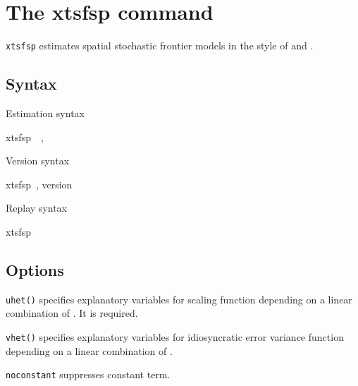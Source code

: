
\section{The xtsfsp command}
{\tt xtsfsp} estimates spatial stochastic frontier models in the style of \cite{orea2019new} and \cite{galli2022spatial}.

\subsection{Syntax}

Estimation syntax

\begin{stsyntax}
	xtsfsp\
    \depvar\
    \optindepvars,\
\end{stsyntax}



\noindent Version syntax

\begin{stsyntax}
	xtsfsp\
	, version
\end{stsyntax}


\noindent Replay syntax

\begin{stsyntax}
	xtsfsp\
\end{stsyntax}

\subsection{Options}

\hangpara
{\tt uhet(\varlist [,noconstant])} specifies explanatory variables for scaling  function depending on a linear combination of \varlist.  It is required.

\hangpara
{\tt vhet(\varlist [,noconstant])} specifies explanatory variables for idiosyncratic error variance function depending on a linear combination of \varlist. 

\hangpara
{\tt noconstant} suppresses constant term.

